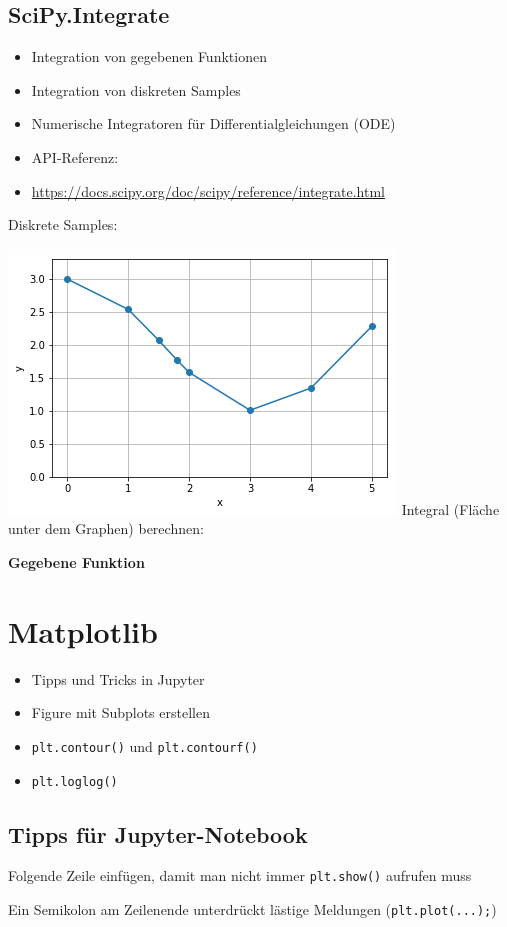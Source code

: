 \subsection{SciPy.Integrate}
\begin{itemize}
	\item Integration von gegebenen Funktionen
	\item Integration von diskreten Samples
	\item Numerische Integratoren für Differentialgleichungen (ODE)
	\item API-Referenz:
	\item[\-] \url{https://docs.scipy.org/doc/scipy/reference/integrate.html}
\end{itemize}

Diskrete Samples:

\includegraphics[width=0.4\linewidth]{images/v9_integrate1}
Integral (Fläche unter dem Graphen) berechnen:

\textbf{Gegebene Funktion}


\section{Matplotlib}
\begin{itemize}
	\item Tipps und Tricks in Jupyter
	\item Figure mit Subplots erstellen
	\item \texttt{plt.contour()} und \texttt{plt.contourf()}
	\item \texttt{plt.loglog()}
\end{itemize}

\subsection{Tipps für Jupyter-Notebook}
Folgende Zeile einfügen, damit man nicht immer \texttt{plt.show()} aufrufen muss

Ein Semikolon am Zeilenende unterdrückt lästige Meldungen (\texttt{plt.plot(...);})


